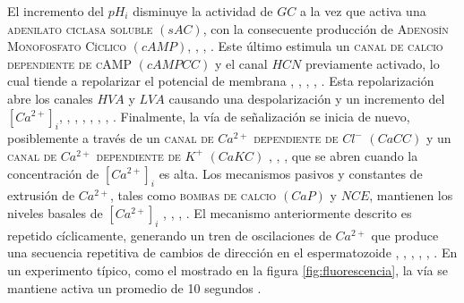 El incremento del $pH_i$ disminuye la actividad de $GC$ a la vez que activa una \textsc{adenilato ciclasa soluble} $(sAC)$, con la consecuente producción de \textsc{Adenosín Monofosfato Cíclico} $(cAMP)$, \citeauthor{Nishigaki:2004p4516} \citep{Nishigaki:2004p4516}, \citeauthor{Cook:1993ul} \citep{Cook:1993ul}, \citeauthor{Beltran:1996fd} \citep{Beltran:1996fd}. Este último estimula un \textsc{canal de calcio dependiente de cAMP} $(cAMPCC)$ y el canal $HCN$ previamente activado, lo cual tiende a repolarizar el potencial de membrana \citeauthor{Strunker:2006tk} \citep{Strunker:2006tk}, \citeauthor{Kaupp:2003p4518} \citep{Kaupp:2003p4518}, \citeauthor{Nishigaki:2004p4516} \citep{Nishigaki:2004p4516}, \citeauthor{Rodriguez:2003do} \citep{Rodriguez:2003do}, \citeauthor{Gauss:1998de} \citep{Gauss:1998de}. Esta repolarización abre los canales $HVA$ y $LVA$ causando una despolarización y un incremento del $[Ca^{2+}]_i$, \citeauthor{Strunker:2006tk} \citep{Strunker:2006tk}, \citeauthor{GranadosGonzalez:2005ia} \citep{GranadosGonzalez:2005ia}, \citeauthor{Kaupp:2003p4518} \citep{Kaupp:2003p4518},\citeauthor{Bohmer:2005ik} \citep{Bohmer:2005ik}, \citeauthor{Wood:2003p4517} \citep{Wood:2003p4517}, \citeauthor{Nishigaki:2004p4516} \citep{Nishigaki:2004p4516}, \citeauthor{Wood:2005gg} \citep{Wood:2005gg}. Finalmente, la vía de señalización se inicia de nuevo, posiblemente a través de un \textsc{canal de} $Ca^{2+}$ \textsc{dependiente de} $Cl^-$ $(CaCC)$ y un \textsc{canal de} $Ca^{2+}$ \textsc{dependiente de} $K^+$ $(CaKC)$ \citeauthor{Wood:2003p4517} \citep{Wood:2003p4517}, \citeauthor{Wood2007} \citep{Wood2007}, \citeauthor{Greenwood:2007hg} \citep{Greenwood:2007hg}, que se abren cuando la concentración de $[Ca^{2+}]_i$ es alta. Los mecanismos pasivos y constantes de extrusión de $Ca^{2+}$, tales como \textsc{bombas de calcio} $(CaP)$ y $NCE$, mantienen los niveles basales de $[Ca^{2+}]_i$ \citeauthor{Nishigaki:2004p4516} \citep{Nishigaki:2004p4516}, \citeauthor{Su:2002fk} \citep{Su:2002fk}, \citeauthor{Rodriguez:2003do} \citep{Rodriguez:2003do}, \citeauthor{Okunade:2004jw} \citep{Okunade:2004jw}. El mecanismo anteriormente descrito es repetido cíclicamente, generando un tren de oscilaciones de $Ca^{2+}$ que produce una secuencia repetitiva de cambios de dirección en el espermatozoide \citeauthor{Guerrero:2010gw}, \citep{Guerrero:2010gw}, \citeauthor{Guerrero:2010gd} \citep{Guerrero:2010gd}, \citeauthor{Bohmer:2005ik} \citep{Bohmer:2005ik}, \citeauthor{Wood:2005gg} \citep{Wood:2005gg}, \citeauthor{Wood2007} \citep{Wood2007}. En un experimento típico, como el mostrado en la figura \ref{fig:fluorescencia}, la vía se mantiene activa un promedio de 10 segundos \citeauthor{Wood:2003p4517} \citep{Wood:2003p4517}.

